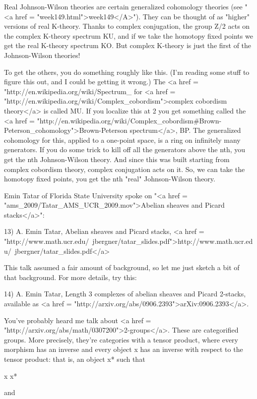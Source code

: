 Real Johnson-Wilson theories are certain generalized cohomology
theories (see "<a href = "week149.html">week149</A>").
They can be thought of as "higher" versions of real
K-theory.  Thanks to complex conjugation, the group Z/2 acts on the
complex K-theory spectrum KU, and if we take the homotopy fixed points
we get the real K-theory spectrum KO.  But complex K-theory is just
the first of the Johnson-Wilson theories!

To get the others, you do something roughly like this.  (I'm reading
some stuff to figure this out, and I could be getting it wrong.)  The
<a href =
"http://en.wikipedia.org/wiki/Spectrum_%
for <a href = "http://en.wikipedia.org/wiki/Complex_cobordism">complex
cobordism theory</a> is called MU.  If you localize this at 2 you get
something called the <a href =
"http://en.wikipedia.org/wiki/Complex_cobordism#Brown-Peterson_cohomology">Brown-Peterson
spectrum</a>, BP.  The generalized cohomology for this, applied to a
one-point space, is a ring on infinitely many generators.  If you do
some trick to kill off all the generators above the nth, you get the
nth Johnson-Wilson theory.  And since this was built starting from
complex cobordism theory, complex conjugation acts on it.  So, we can
take the homotopy fixed points, you get the nth "real"
Johnson-Wilson theory.

Emin Tatar of Florida State University spoke on "<a href =
"ams_2009/Tatar_AMS_UCR_2009.mov">Abelian sheaves and Picard
stacks</a>":

13) A. Emin Tatar, Abelian sheaves and Picard stacks, 
<a href = "http://www.math.ucr.edu/~jbergner/tatar_slides.pdf">http://www.math.ucr.edu/~jbergner/tatar_slides.pdf</a>

This talk assumed a fair amount of background, so let me just sketch a
bit of that background.  For more details, try this:

14) A. Emin Tatar, Length 3 complexes of abelian sheaves and Picard
2-stacks, available as <a href = "http://arxiv.org/abs/0906.2393">arXiv:0906.2393</a>.

You've probably heard me talk about <a href =
"http://arxiv.org/abs/math/0307200">2-groups</a>.  These are
categorified groups.  More precisely, they're categories with a tensor
product, where every morphism has an inverse and every object x has an
inverse with respect to the tensor product: that is, an object x* such
that

x \otimes  x* 

and

